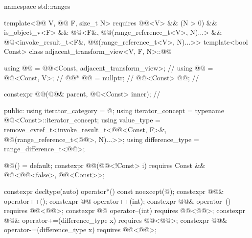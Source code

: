 \begin{codeblock}
namespace std::ranges {
  template<@@ V, @@ F, size_t N>
    requires @@<V> && (N > 0) && is_object_v<F> &&
             @@<F&, @@(range_reference_t<V>, N)...> &&
             @@<invoke_result_t<F&, @@(range_reference_t<V>, N)...>>
  template<bool Const>
  class adjacent_transform_view<V, F, N>::@@ {
    using @@ = @@<Const, adjacent_transform_view>;         // \expos
    using @@ = @@<Const, V>;                                 // \expos
    @@* @@ = nullptr;                                          // \expos
    @@<Const> @@;                                       // \expos

    constexpr @@(@@& parent, @@<Const> inner);    // \expos

  public:
    using iterator_category = @\seebelow@;
    using iterator_concept  = typename @@<Const>::iterator_concept;
    using value_type =
      remove_cvref_t<invoke_result_t<@@<Const, F>&,
                                     @@(range_reference_t<@@>, N)...>>;
    using difference_type = range_difference_t<@@>;

    @@() = default;
    constexpr @@(@@<!Const> i)
      requires Const && @@<@@<false>, @@<Const>>;

    constexpr decltype(auto) operator*() const noexcept(@\seebelow@);
    constexpr @@& operator++();
    constexpr @@ operator++(int);
    constexpr @@& operator--() requires @@<@@>;
    constexpr @@ operator--(int) requires @@<@@>;
    constexpr @@& operator+=(difference_type x) requires @@<@@>;
    constexpr @@& operator-=(difference_type x) requires @@<@@>;

}}
\end{codeblock}

